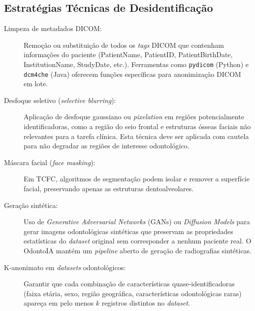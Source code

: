\subsection{Estratégias Técnicas de Desidentificação}

\begin{description}
  \item[Limpeza de metadados DICOM:] Remoção ou substituição de todos os
    \textit{tags} DICOM que contenham informações do paciente (PatientName,
    PatientID, PatientBirthDate, InstitutionName, StudyDate, etc.). Ferramentas
    como \texttt{pydicom} (Python) e \texttt{dcm4che} (Java) oferecem funções
    específicas para anonimização DICOM em lote.

  \item[Desfoque seletivo (\textit{selective blurring}):] Aplicação de
    desfoque gaussiano ou \textit{pixelation} em regiões potencialmente
    identificadoras, como a região do seio frontal e estruturas ósseas faciais
    não relevantes para a tarefa clínica. Esta técnica deve ser aplicada com
    cautela para não degradar as regiões de interesse odontológico.

  \item[Máscara facial (\textit{face masking}):] Em TCFC, algoritmos de
    segmentação podem isolar e remover a superfície facial, preservando apenas
    as estruturas dentoalveolares.

  \item[Geração sintética:] Uso de \textit{Generative Adversarial Networks}
    (GANs) ou \textit{Diffusion Models} para gerar imagens odontológicas
    sintéticas que preservam as propriedades estatísticas do \textit{dataset}
    original sem corresponder a nenhum paciente real. O OdontoIA mantém um
    \textit{pipeline} aberto de geração de radiografias sintéticas.

  \item[K-anonimato em \textit{datasets} odontológicos:] Garantir que cada
    combinação de características quase-identificadoras (faixa etária, sexo,
    região geográfica, características odontológicas raras) apareça em pelo
    menos $k$ registros distintos no \textit{dataset}.
\end{description}


